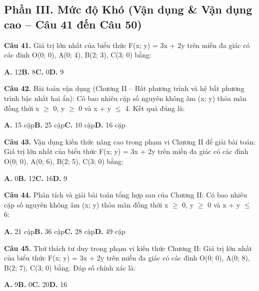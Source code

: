 \documentclass[11pt,a4paper]{article}
\begin{document}
\subsection*{\color{accent} Phần III. Mức độ Khó (Vận dụng \& Vận dụng cao -- Câu 41 đến Câu 50)}
\textbf{\color{primary} Câu 41.} Giá trị lớn nhất của biểu thức F(x; y) = 3x + 2y trên miền đa giác có các đỉnh O(0; 0), A(0; 4), B(2; 3), C(3; 0) bằng:\par
\hspace*{1.5em}\textbf{A.} 12\quad\quad \textbf{B.} 8\quad\quad \textbf{C.} 0\quad\quad \textbf{D.} 9\par\vspace{2pt}
\textbf{\color{primary} Câu 42.} Bài toán vận dụng (Chương II – Bất phương trình và hệ bất phương trình bậc nhất hai ẩn): Có bao nhiêu cặp số nguyên không âm (x; y) thỏa mãn đồng thời x $\ge$ 0, y $\ge$ 0 và x + y $\le$ 4. Kết quả đúng là:\par
\hspace*{1.5em}\textbf{A.} 15 cặp\quad\quad \textbf{B.} 25 cặp\quad\quad \textbf{C.} 10 cặp\quad\quad \textbf{D.} 16 cặp\par\vspace{2pt}
\textbf{\color{primary} Câu 43.} Vận dụng kiến thức nâng cao trong phạm vi Chương II để giải bài toán: Giá trị lớn nhất của biểu thức F(x; y) = 3x + 2y trên miền đa giác có các đỉnh O(0; 0), A(0; 6), B(2; 5), C(3; 0) bằng:\par
\hspace*{1.5em}\textbf{A.} 0\quad\quad \textbf{B.} 12\quad\quad \textbf{C.} 16\quad\quad \textbf{D.} 9\par\vspace{2pt}
\textbf{\color{primary} Câu 44.} Phân tích và giải bài toán tổng hợp sau của Chương II: Có bao nhiêu cặp số nguyên không âm (x; y) thỏa mãn đồng thời x $\ge$ 0, y $\ge$ 0 và x + y $\le$ 6:\par
\hspace*{1.5em}\textbf{A.} 21 cặp\quad\quad \textbf{B.} 36 cặp\quad\quad \textbf{C.} 28 cặp\quad\quad \textbf{D.} 49 cặp\par\vspace{2pt}
\textbf{\color{primary} Câu 45.} Thử thách tư duy trong phạm vi kiến thức Chương II: Giá trị lớn nhất của biểu thức F(x; y) = 3x + 2y trên miền đa giác có các đỉnh O(0; 0), A(0; 8), B(2; 7), C(3; 0) bằng. Đáp số chính xác là:\par
\hspace*{1.5em}\textbf{A.} 9\quad\quad \textbf{B.} 0\quad\quad \textbf{C.} 20\quad\quad \textbf{D.} 16\par\vspace{2pt}
\end{document}
